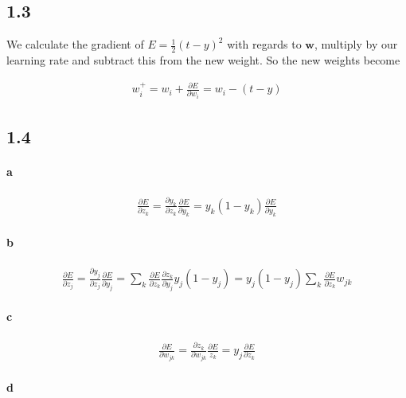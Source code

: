 \documentclass{article}
\begin{document}
\subsection*{1.3}

We calculate the gradient of $E = \frac{1}{2} \left(t - y \right)^2$ with regards
to $\mathbf{w}$, multiply by our learning rate and subtract this from the new
weight. So the new weights become

\begin{align}
  w_i^+ = w_i + \frac{\partial E}{\partial w_i} = w_i - (t - y)
\end{align}

\subsection*{1.4}

\paragraph{a}

\begin{align}
  \frac{\partial E}{\partial z_k} = \frac{\partial y_k}{\partial z_k} \frac{\partial E}{\partial y_k} =
  y_k \left( 1 - y_k \right) \frac{\partial E}{\partial y_k}
\end{align}

\paragraph{b}

\begin{align}
  \frac{\partial E}{\partial z_j} = \frac{\partial y_j}{\partial z_j} \frac{\partial E}{\partial y_j} =
  \sum_k \frac{\partial E}{\partial z_k}\frac{\partial z_k}{\partial y_j} y_j \left( 1 - y_j \right) =
   y_j \left( 1 - y_j \right) \sum_k \frac{\partial E}{\partial z_k}w_{jk}
\end{align}

\paragraph{c}

\begin{align}
  \frac{\partial E}{\partial w_{jk}} = \frac{\partial z_k}{\partial w_{jk}} \frac{\partial E}{z_k} =
  y_j \frac{\partial E}{\partial z_k}
\end{align}

\paragraph{d}
\end{document}
